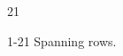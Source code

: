 \documentclass[paper=A4]{ropas-poster}
\begin{document}
\begin{postergrid}{2}{1}
\begin{posterblock}{1-2}{1}
Spanning rows.
\end{posterblock}
\end{postergrid}
\end{document}
